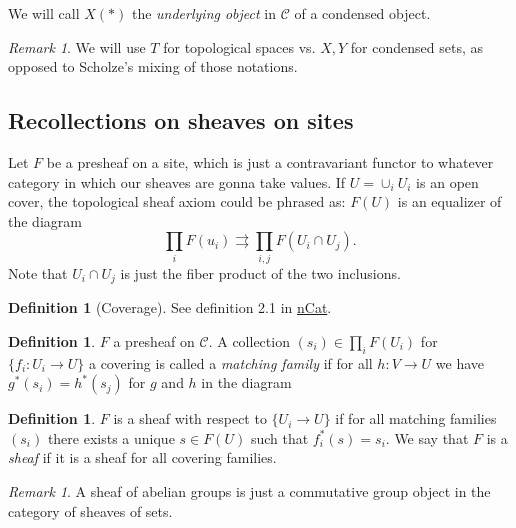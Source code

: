 \documentclass[11pt,A4]{article}
\theoremstyle{plain}
\theoremstyle{definition}
\newtheorem{defn}[thm]{Definition}
\theoremstyle{remark}
\newtheorem{rem}[thm]{Remark}
\newcommand{\1}{\mathbbm{1}}
\newcommand{\C}{\mathscr{C}}
\begin{document}
We will call $X(*)$ the \textit{underlying object} in $\C$ of a condensed object.

\begin{rem}
    We will use $T$ for topological spaces vs. $X,Y$ for condensed sets, as opposed to Scholze's mixing of those notations.
\end{rem}

\subsection{Recollections on sheaves on sites}

Let $F$ be a presheaf on a site, which is just a contravariant functor to whatever category in which our sheaves are gonna take values.
If $U=\cup_{i}U_{i}$ is an open cover, the topological sheaf axiom could be phrased as: $F(U)$ is an equalizer of the diagram
\[ \prod_{i}F(u_{i})\rightrightarrows \prod_{i,j}F(U_{i}\cap U_{j}). \]
Note that $U_{i}\cap U_{j}$ is just the fiber product of the two inclusions.

\begin{defn}[Coverage]
    See definition 2.1 in \href{https://ncatlab.org/nlab/show/coverage}{nCat}.
\end{defn}

\begin{defn}
    $F$ a presheaf on $\C$.
    A collection $(s_{i})\in \prod_{i}F(U_{i})$ for $\{f_{i}\colon U_{i}\to U\}$ a covering is called a \textit{matching family} if for all $h\colon V\to U$ we have $g^{*}(s_{i})=h^{*}(s_{j})$ for $g$ and $h$ in the diagram
    \begin{center}
    \end{center}
\end{defn}

\begin{defn}
    $F$ is a sheaf with respect to $\{U_{i}\to U\}$ if for all matching families $(s_{i})$ there exists a unique $s\in F(U)$ such that $f_{i}^{*}(s)=s_{i}$.
    We say that $F$ is a \textit{sheaf} if it is a sheaf for all covering families.
\end{defn}

\begin{rem}
    A sheaf of abelian groups is just a commutative group object in the category of sheaves of sets.
\end{rem}
\end{document}
